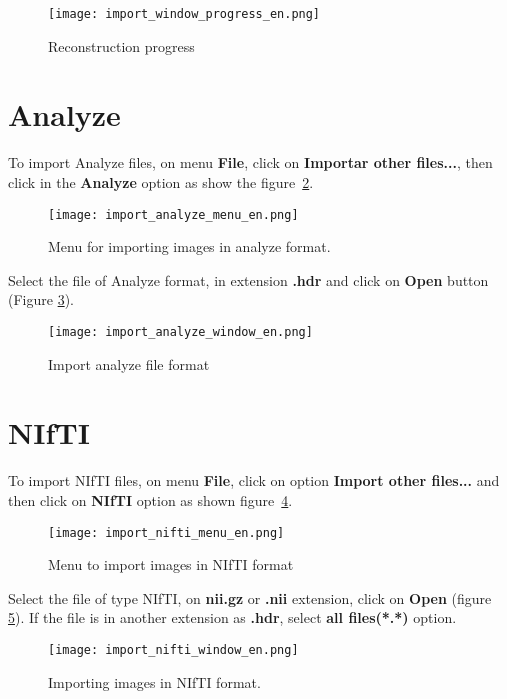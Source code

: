\begin{figure}[!htb]
\centering
\texttt{[image: import\_window\_progress\_en.png]} 
\caption{Reconstruction progress}
\label{fig:prog_recons}
\end{figure}

\newpage

\section{Analyze}

To import Analyze files, on menu \textbf{File}, click on \textbf{Importar other files...}, then click in the \textbf{Analyze} option as show the figure~\ref{fig:analyze_menu}.

\begin{figure}[!htb]
\centering
\texttt{[image: import\_analyze\_menu\_en.png]}
\caption{Menu for importing images in analyze format.}
\label{fig:analyze_menu}
\end{figure}

Select the file of Analyze format, in extension \textbf{.hdr} and click on \textbf{Open} button (Figure \ref{fig:analyze_import}).
 
\begin{figure}[!htb]
\centering
\texttt{[image: import\_analyze\_window\_en.png]}
\caption{Import analyze file format}
\label{fig:analyze_import}
\end{figure}

\section{NIfTI}

To import NIfTI files, on menu \textbf{File}, click on option \textbf{Import other files...} and then click on \textbf{NIfTI} option as shown figure~\ref{fig:import_nifti_menu_pt}.


\begin{figure}[!htb]
\centering
\texttt{[image: import\_nifti\_menu\_en.png]}
\caption{Menu to import images in NIfTI format}
\label{fig:import_nifti_menu_pt}
\end{figure}

Select the file of type NIfTI, on \textbf{nii.gz} or \textbf{.nii} extension, click on \textbf{Open} (figure \ref{fig:import_nifti_window_pt}). If the file is in another extension as \textbf{.hdr}, select \textbf{all files(*.*)} option.

\begin{figure}[!htb]
\centering
\texttt{[image: import\_nifti\_window\_en.png]}
\caption{Importing images in NIfTI format.}
\label{fig:import_nifti_window_pt}
\end{figure}

